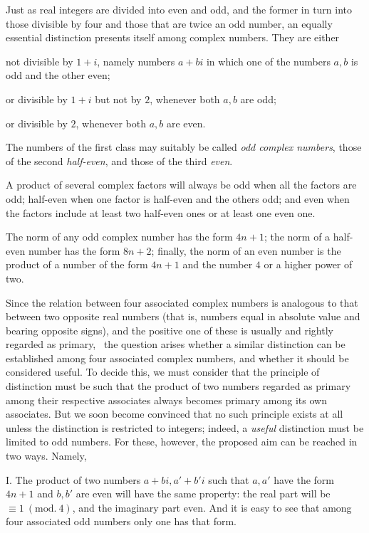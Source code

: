 Just as real integers are divided into even and odd, and the former in turn into those divisible by four and those that are twice an odd number, an equally essential distinction presents itself among complex numbers. They are either

not divisible by $1+i$, namely numbers $a+bi$ in which one of the numbers $a,b$ is odd and the other even;

or divisible by $1+i$ but not by $2$, whenever both $a,b$ are odd;

or divisible by $2$, whenever both $a,b$ are even.

The numbers of the first class may suitably be called \emph{odd complex numbers}, those of the second \emph{half-even}, and those of the third \emph{even}.

A product of several complex factors will always be odd when all the factors are odd; half-even when one factor is half-even and the others odd; and even when the factors include at least two half-even ones or at least one even one.

The norm of any odd complex number has the form $4n+1$; the norm of a half-even number has the form $8n+2$; finally, the norm of an even number is the product of a number of the form $4n+1$ and the number $4$ or a higher power of two.

Since the relation between four associated complex numbers is analogous to that between two opposite real numbers (that is, numbers equal in absolute value and bearing opposite signs), and the positive one of these is usually and rightly regarded as primary,\ %
the question arises whether a similar distinction can be established among four associated complex numbers, and whether it should be considered useful. To decide this, we must consider that the principle of distinction must be such that the product of two numbers regarded as primary among their respective associates always becomes primary among its own associates. But we soon become convinced that no such principle exists at all unless the distinction is restricted to integers; indeed, a \emph{useful} distinction must be limited to odd numbers. For these, however, the proposed aim can be reached in two ways. Namely,

I. The product of two numbers $a+bi,a'+b'i$ such that $a,a'$ have the form $4n+1$ and $b,b'$ are even will have the same property: the real part will be $\equiv1\ (\mathrm{mod.}\ 4)$, and the imaginary part even. And it is easy to see that among four associated odd numbers only one has that form.


